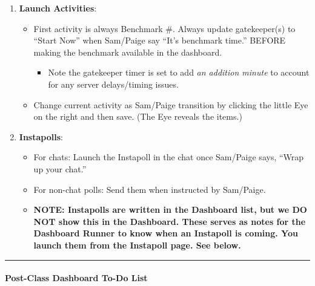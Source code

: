 \documentclass[
]{article}
\providecommand{\tightlist}{%
  \setlength{\itemsep}{0pt}\setlength{\parskip}{0pt}}
\begin{document}
\begin{enumerate}
\def\labelenumi{\arabic{enumi}.}
\tightlist
\item
  \textbf{Launch Activities}:

  \begin{itemize}
  \tightlist
  \item
    First activity is always Benchmark \#. Always update gatekeeper(s) to ``Start Now'' when Sam/Paige say ``It's benchmark time.'' BEFORE making the benchmark available in the dashboard.

    \begin{itemize}
    \tightlist
    \item
      Note the gatekeeper timer is set to add \emph{an addition minute} to account for any server delays/timing issues.
    \end{itemize}
  \item
    Change current activity as Sam/Paige transition by clicking the little Eye on the right and then save. (The Eye reveals the items.)
  \end{itemize}
\item
  \textbf{Instapolls}:

  \begin{itemize}
  \tightlist
  \item
    For chats: Launch the Instapoll in the chat once Sam/Paige says, ``Wrap up your chat.''\\
  \item
    For non-chat polls: Send them when instructed by Sam/Paige.\\
  \item
    \textbf{NOTE: Instapolls are written in the Dashboard list, but we DO NOT show this in the Dashboard. These serves as notes for the Dashboard Runner to know when an Instapoll is coming. You launch them from the Instapoll page. See below.}
  \end{itemize}
\end{enumerate}

\begin{center}\rule{0.5\linewidth}{0.5pt}\end{center}

\hypertarget{post-class-dashboard-to-do-list}{%
\paragraph{Post-Class Dashboard To-Do List}\label{post-class-dashboard-to-do-list}}
\end{document}
